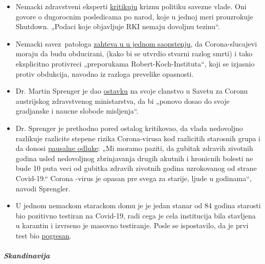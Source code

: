 \begin{itemize}
\tightlist
\item
  Nemacki zdravstveni eksperti
  \href{https://www.tagesschau.de/investigativ/ndr-wdr/corona-experten-thesenpapier-101.html}{kritikuju}
  kriznu politiku savezne vlade. Oni govore o dugorocnim posledicama po
  narod, koje u jednoj meri prouzrokuje Shutdown. „Podaci koje
  objavljuje RKI nemaju dovoljnu tezinu``.
\item
  Nemacki savez~patologa
  \href{https://www.pathologie-dgp.de/die-dgp/aktuelles/meldung/pressemitteilung-an-corona-verstorbene-sollten-obduziert-werden/}{zahteva
  u u jednom saopstenju}, da Corona-slucajevi moraju da budu obducirani,
  (kako bi se utvrdio stvarni razlog smrti) i tako eksplicitno
  protivreci „preporukama Robert-Koch-Instituta``, koji se izjasnio
  protiv obdukcija, navodno iz razloga prevelike opasnosti.
\item
  Dr. Martin Sprenger je dao
  \href{https://mailchi.mp/addendum/fles-home-office-260342}{ostavku} na
  svoje clanstvo u Savetu za Coronu austrijskog zdravstvenog
  ministarstva, da bi „ponovo dosao do svoje gradjanske i naucne slobode
  misljenja``.
\item
  Dr. Sprenger je prethodno pored ostalog kritikovao, da vlada
  nedovoljno razlikuje razlicite stepene rizika Corona-virusa kod
  razlicitih starosnih grupa i da donosi
  \href{https://www.addendum.org/coronavirus/interview-sprenger/}{pausalne
  odluke}: „Mi moramo paziti, da gubitak zdravih zivotnih godina usled
  nedovoljnog zbrinjavanja drugih akutnih i hronicnih bolesti ne bude 10
  puta veci od gubitka zdravih zivotnih godina uzrokovanog od strane
  Covid-19.`` Corona -virus je opasan pre svega za starije, ljude u
  godinama``, navodi Sprengler.
\item
  U jednom nemackom starackom domu je je jedan stanar od 84 godina
  starosti bio pozitivno testiran na Covid-19, radi cega je cela
  institucija bila stavljena u karantin i izvrseno je masovno
  testiranje. Posle se ispostavilo, da je prvi test bio
  \href{https://www.schwerin.de/news/4a3e5560-78c9-11ea-b543-1967de695b51/}{pogresan}.
\end{itemize}

\hypertarget{skandinavija}{%
\subparagraph{\texorpdfstring{\textbf{Skandinavija}}{Skandinavija}}\label{skandinavija}}

